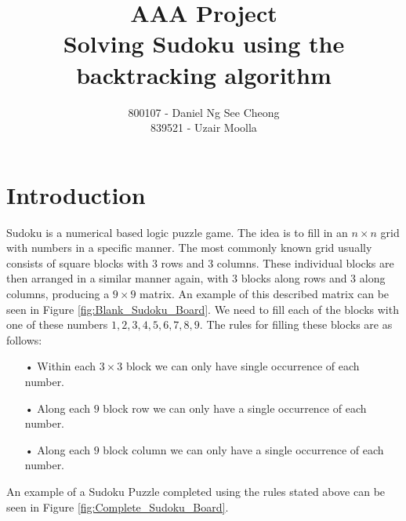 \documentclass[12pt,a4paper,titlepage]{article}
\author{800107 - Daniel Ng See Cheong\\
		839521 - Uzair Moolla}
\title{
	AAA Project\\
	\large Solving Sudoku using the backtracking algorithm
}
\begin{document}
\maketitle

\section{Introduction}
Sudoku is a numerical based logic puzzle game. The idea is to fill in an $n\times n$ grid with numbers in a specific manner. The most commonly known grid usually consists of square blocks with 3 rows and 3 columns. These individual blocks are then arranged in a similar manner again, with 3 blocks along rows and 3 along columns, producing a $9 \times 9$ matrix. An example of this described matrix can be seen in Figure  \ref{fig:Blank_Sudoku_Board}. We need to fill each of the blocks with one of these numbers ${1,2,3,4,5,6,7,8,9}$. The rules for filling these blocks are as follows:
\begin{itemize}
\item[•] Within each $3 \times 3 $ block we can only have single occurrence of each number.
\item[•] Along each $9$ block row we can only have a single occurrence of each number.
\item[•] Along each $9$ block column we can only have a single occurrence of each number.
\end{itemize}

\noindent
An example of a Sudoku Puzzle completed using the rules stated above can be seen in Figure \ref{fig:Complete_Sudoku_Board}.
\end{document}

